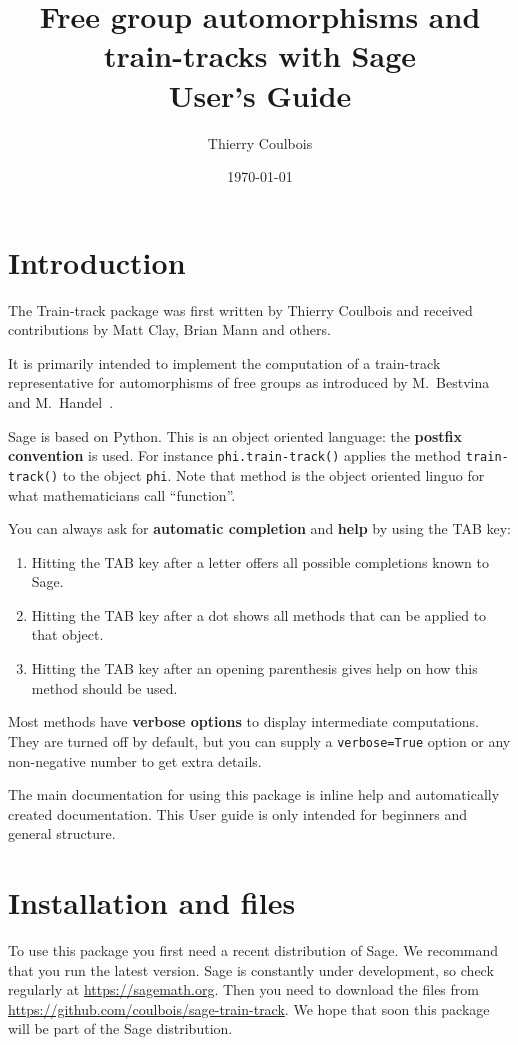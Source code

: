 \documentclass[10pt,a4paper]{article}
\title{Free group automorphisms and train-tracks with Sage\\
User's Guide}
\author{Thierry Coulbois}
\date{\today}
\begin{document}
\maketitle



\section{Introduction}

The Train-track package was first written by Thierry Coulbois and
received contributions by Matt Clay, Brian Mann and others.

It is primarily intended to implement the computation of a train-track
representative for automorphisms of free groups as introduced by
M.~Bestvina and M.~Handel~\cite{bh-traintrack}.


Sage is based on Python. This is an object oriented language: the
\textbf{postfix convention} is used. For instance
\texttt{phi.train-track()} applies the method \texttt{train-track()}
to the object \texttt{phi}. Note that method is the
object oriented linguo for what mathematicians call ``function''.

You can always ask for \textbf{automatic completion} and \textbf{help} by using the TAB key: 
\begin{enumerate}
\item Hitting the TAB key after a letter offers all possible
  completions known to Sage.
\item Hitting the TAB key after a dot shows all methods that can be
  applied to that object.
\item Hitting the TAB key after an opening parenthesis gives help on
  how this method should be used.
\end{enumerate}

Most methods have \textbf{verbose options} to display intermediate
computations. They are turned off by default, but you can supply a
\texttt{verbose=True} option or any non-negative number to get extra
details.

The main documentation for using this package is inline help and
automatically created documentation. This User guide is only
intended for beginners and general structure.

\section{Installation and files}

To use this package you first need a recent distribution of Sage. We
recommand that you run the latest version. Sage is constantly under
development, so check regularly at \url{https://sagemath.org}. Then
you need to download the files from
\url{https://github.com/coulbois/sage-train-track}. We hope that soon
this package will be part of the Sage distribution.
\end{document}
